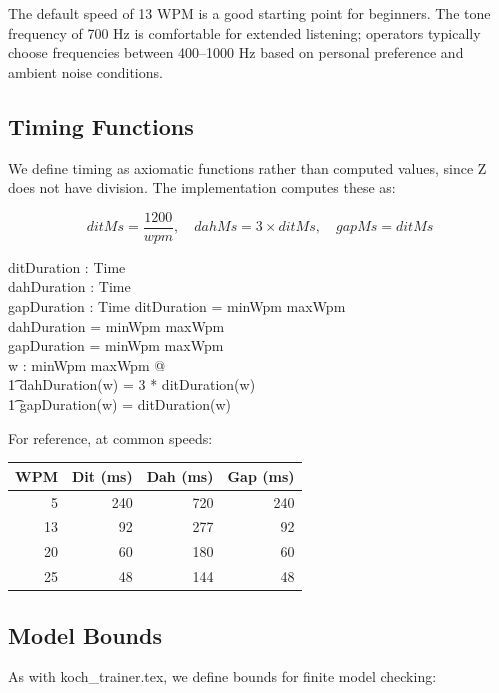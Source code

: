 \documentclass[a4paper,10pt,fleqn]{article}
\begin{document}
The default speed of 13 WPM is a good starting point for beginners. The tone
frequency of 700 Hz is comfortable for extended listening; operators typically
choose frequencies between 400--1000 Hz based on personal preference and
ambient noise conditions.

\subsection{Timing Functions}

We define timing as axiomatic functions rather than computed values, since
Z does not have division. The implementation computes these as:

\[
ditMs = \frac{1200}{wpm}, \quad
dahMs = 3 \times ditMs, \quad
gapMs = ditMs
\]

\begin{axdef}
ditDuration : \nat \pfun Time \\
dahDuration : \nat \pfun Time \\
gapDuration : \nat \pfun Time
\where
\dom ditDuration = minWpm \upto maxWpm \\
\dom dahDuration = minWpm \upto maxWpm \\
\dom gapDuration = minWpm \upto maxWpm \\
\forall w : minWpm \upto maxWpm @ \\
\t1 dahDuration(w) = 3 * ditDuration(w) \land \\
\t1 gapDuration(w) = ditDuration(w)
\end{axdef}

For reference, at common speeds:

\begin{center}
\begin{tabular}{rrrr}
\hline
WPM & Dit (ms) & Dah (ms) & Gap (ms) \\
\hline
5 & 240 & 720 & 240 \\
13 & 92 & 277 & 92 \\
20 & 60 & 180 & 60 \\
25 & 48 & 144 & 48 \\
\hline
\end{tabular}
\end{center}

\subsection{Model Bounds}

As with koch\_trainer.tex, we define bounds for finite model checking:
\end{document}
